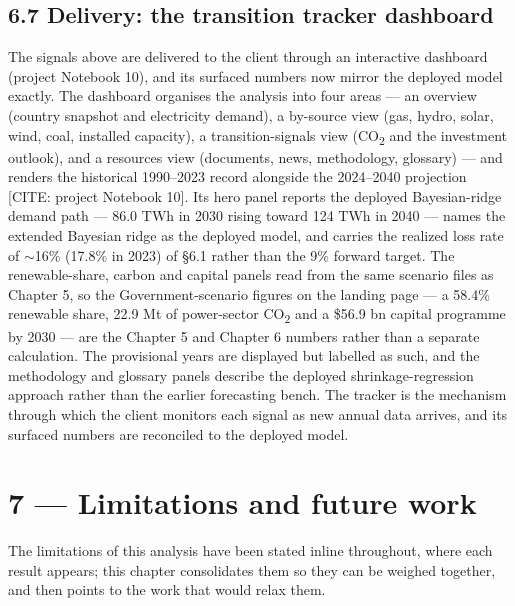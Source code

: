\documentclass[10pt,twocolumn]{article}
\newcommand{\mk}[1]{{\color{amber}\small #1}}
\begin{document}
\subsection*{6.7 Delivery: the transition tracker dashboard}

The signals above are delivered to the client through an interactive dashboard (project Notebook 10), and its surfaced numbers now mirror the deployed model exactly. The dashboard organises the analysis into four areas --- an overview (country snapshot and electricity demand), a by-source view (gas, hydro, solar, wind, coal, installed capacity), a transition-signals view (CO\textsubscript{2} and the investment outlook), and a resources view (documents, news, methodology, glossary) --- and renders the historical 1990--2023 record alongside the 2024--2040 projection \mk{[CITE: project Notebook 10]}. Its hero panel reports the deployed Bayesian-ridge demand path --- 86.0 TWh in 2030 rising toward 124 TWh in 2040 --- names the extended Bayesian ridge as the deployed model, and carries the realized loss rate of $\sim$16\% (17.8\% in 2023) of \S{}6.1 rather than the 9\% forward target. The renewable-share, carbon and capital panels read from the same scenario files as Chapter 5, so the Government-scenario figures on the landing page --- a 58.4\% renewable share, 22.9 Mt of power-sector CO\textsubscript{2} and a \$56.9 bn capital programme by 2030 --- are the Chapter 5 and Chapter 6 numbers rather than a separate calculation. The provisional years are displayed but labelled as such, and the methodology and glossary panels describe the deployed shrinkage-regression approach rather than the earlier forecasting bench. The tracker is the mechanism through which the client monitors each signal as new annual data arrives, and its surfaced numbers are reconciled to the deployed model.

\section*{7 --- Limitations and future work}

The limitations of this analysis have been stated inline throughout, where each result appears; this chapter consolidates them so they can be weighed together, and then points to the work that would relax them.
\end{document}
